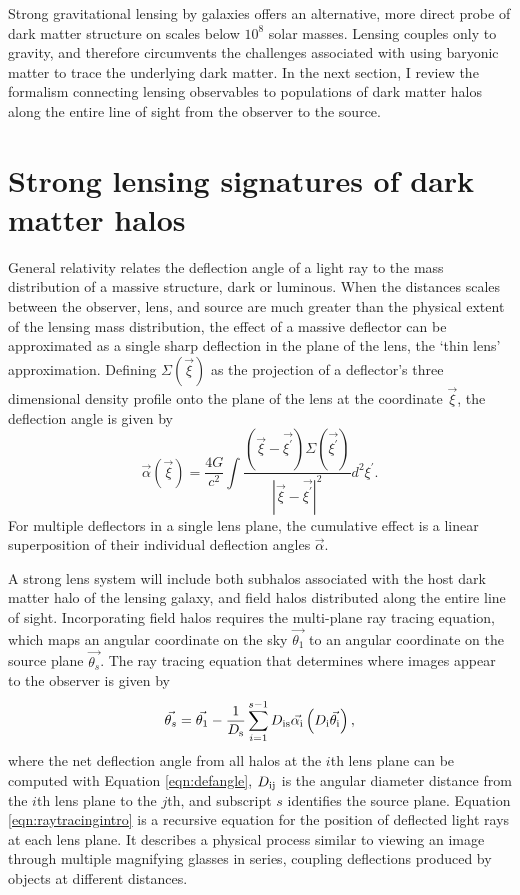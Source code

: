 Strong gravitational lensing by galaxies offers an alternative, more direct probe of dark matter structure on scales below $10^8$ solar masses. Lensing couples only to gravity, and therefore circumvents the challenges associated with using baryonic matter to trace the underlying dark matter. In the next section, I review the formalism connecting lensing observables to populations of dark matter halos along the entire line of sight from the observer to the source. 

\section{Strong lensing signatures of dark matter halos}
\indent General relativity relates the deflection angle of a light ray to the mass distribution of a massive structure, dark or luminous. When the distances scales between the observer, lens, and source are much greater than the physical extent of the lensing mass distribution, the effect of a massive deflector can be approximated as a single sharp deflection in the plane of the lens, the `thin lens' approximation. Defining $\Sigma\left(\vec{\xi}\right)$ as the projection of a deflector's three dimensional density profile onto the plane of the lens at the coordinate $\vec{\xi}$, the deflection angle is given by \citep{BlandfordNarayan86}
\begin{equation}
\label{eqn:defangle}
\vec{\alpha}\left(\vec{\xi}\right) = \frac{4G }{c^2} \int \frac{\left(\vec{\xi} - \vec{\xi^{\prime}}\right) \Sigma\left(\vec{\xi^{\prime}}\right)}{| \vec{\xi} - \vec{\xi^{\prime}}|^2} d^2 \xi^{\prime}. 
\end{equation}
For multiple deflectors in a single lens plane, the cumulative effect is a linear superposition of their individual deflection angles $\vec{\alpha}$. 

A strong lens system will include both subhalos associated with the host dark matter halo of the lensing galaxy, and field halos distributed along the entire line of sight. Incorporating field halos requires the multi-plane ray tracing equation, which maps an angular coordinate on the sky $\vec{\theta_1}$ to an angular coordinate on the source plane $\vec{\theta_s}$. The ray tracing equation that determines where images appear to the observer is given by \citep{BlandfordNarayan86}
\begin{equation}
\label{eqn:raytracingintro}
\vec{\theta_s} = \vec{\theta_1} - \frac{1}{D_{\rm{s}}} \sum_{i=1}^{s-1} D_{\rm{is}}{\vec{\alpha_{\rm{i}}}} \left(D_{\rm{i}} \vec{\theta_{\rm{i}}}\right),
\end{equation} 
where the net deflection angle from all halos at the $i$th lens plane can be computed with Equation \ref{eqn:defangle}, $D_{\rm{ij}}$ is the angular diameter distance from the $i$th lens plane to the $j$th, and subscript $s$ identifies the source plane. Equation \ref{eqn:raytracingintro} is a recursive equation for the position of deflected light rays at each lens plane. It describes a physical process similar to viewing an image through multiple magnifying glasses in series, coupling deflections produced by objects at different distances. 

